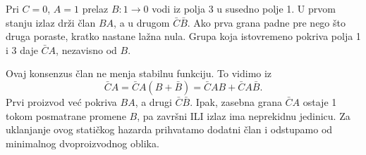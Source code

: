 
Pri \(C=0\), \(A=1\) prelaz \(B:1\to0\) vodi iz polja 3 u susedno polje 1. U prvom stanju izlaz drži član \(BA\), a u drugom \(\bar C\bar B\). Ako prva grana padne pre nego što druga poraste, kratko nastane lažna nula. Grupa koja istovremeno pokriva polja 1 i 3 daje \(\bar C A\), nezavisno od \(B\).

Ovaj konsenzus član ne menja stabilnu funkciju. To vidimo iz
\[
\bar C A=\bar C A(B+\bar B)=\bar C AB+\bar C A\bar B.
\]
Prvi proizvod već pokriva \(BA\), a drugi \(\bar C\bar B\). Ipak, zasebna grana \(\bar C A\) ostaje 1 tokom posmatrane promene \(B\), pa završni ILI izlaz ima neprekidnu jedinicu. Za uklanjanje ovog statičkog hazarda prihvatamo dodatni član i odstupamo od minimalnog dvoproizvodnog oblika.

